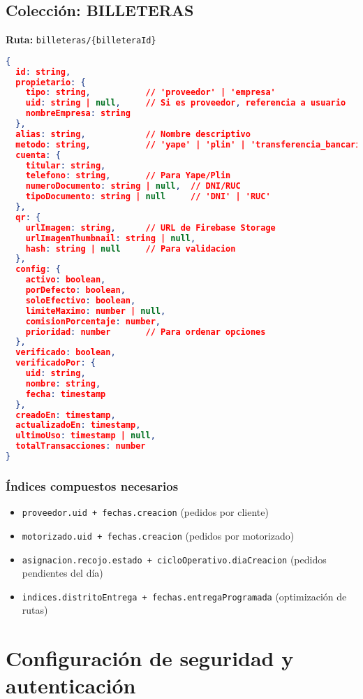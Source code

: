 \section{Colección: BILLETERAS}

\textbf{Ruta:} \texttt{billeteras/\{billeteraId\}}

\begin{lstlisting}[language=json,caption={Estructura de documento Billetera}]
{
  id: string,
  propietario: {
    tipo: string,           // 'proveedor' | 'empresa'
    uid: string | null,     // Si es proveedor, referencia a usuario
    nombreEmpresa: string
  },
  alias: string,            // Nombre descriptivo
  metodo: string,           // 'yape' | 'plin' | 'transferencia_bancaria'
  cuenta: {
    titular: string,
    telefono: string,       // Para Yape/Plin
    numeroDocumento: string | null,  // DNI/RUC
    tipoDocumento: string | null     // 'DNI' | 'RUC'
  },
  qr: {
    urlImagen: string,      // URL de Firebase Storage
    urlImagenThumbnail: string | null,
    hash: string | null     // Para validacion
  },
  config: {
    activo: boolean,
    porDefecto: boolean,
    soloEfectivo: boolean,
    limiteMaximo: number | null,
    comisionPorcentaje: number,
    prioridad: number       // Para ordenar opciones
  },
  verificado: boolean,
  verificadoPor: {
    uid: string,
    nombre: string,
    fecha: timestamp
  },
  creadoEn: timestamp,
  actualizadoEn: timestamp,
  ultimoUso: timestamp | null,
  totalTransacciones: number
}
\end{lstlisting}

\subsection{Índices compuestos necesarios}

\begin{itemize}
    \item \texttt{proveedor.uid + fechas.creacion} (pedidos por cliente)
    \item \texttt{motorizado.uid + fechas.creacion} (pedidos por motorizado)
    \item \texttt{asignacion.recojo.estado + cicloOperativo.diaCreacion} (pedidos pendientes del día)
    \item \texttt{indices.distritoEntrega + fechas.entregaProgramada} (optimización de rutas)
\end{itemize}

\chapter{Configuración de seguridad y autenticación}
\label{anexo:seguridad}

